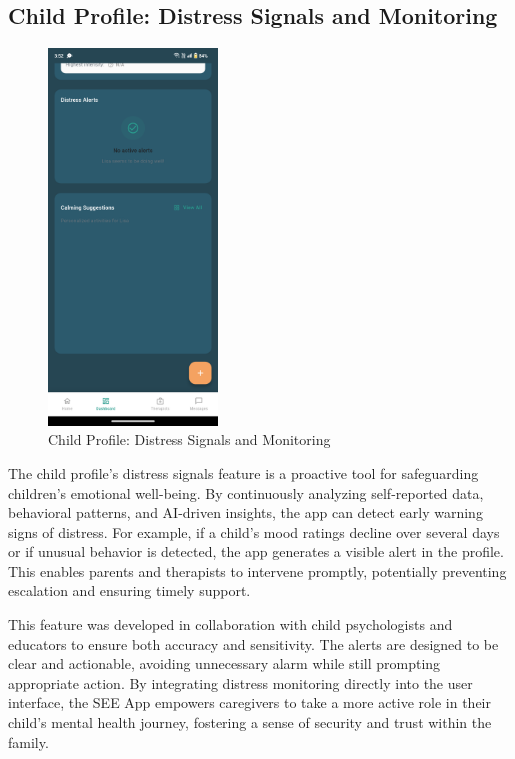 \documentclass[12pt,a4paper]{article}
\newcommand{\sectiontitle}[1]{\subsection{#1}}
\begin{document}
\sectiontitle{Child Profile: Distress Signals and Monitoring}

\begin{figure}[H]
    \centering
    \includegraphics[width=0.4\textwidth]{Screenshots/restofchildprofilethatshowsthedistresssignals.png}
    \caption{Child Profile: Distress Signals and Monitoring}
    \label{fig:child-profile-distress}
\end{figure}
The child profile's distress signals feature is a proactive tool for safeguarding children's emotional well-being. By continuously analyzing self-reported data, behavioral patterns, and AI-driven insights, the app can detect early warning signs of distress. For example, if a child's mood ratings decline over several days or if unusual behavior is detected, the app generates a visible alert in the profile. This enables parents and therapists to intervene promptly, potentially preventing escalation and ensuring timely support.

This feature was developed in collaboration with child psychologists and educators to ensure both accuracy and sensitivity. The alerts are designed to be clear and actionable, avoiding unnecessary alarm while still prompting appropriate action. By integrating distress monitoring directly into the user interface, the SEE App empowers caregivers to take a more active role in their child's mental health journey, fostering a sense of security and trust within the family.
\end{document}
